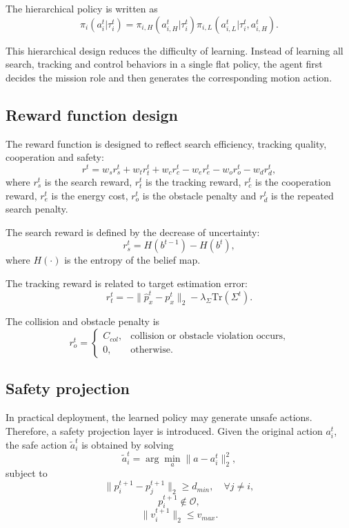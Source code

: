 \documentclass[14pt,a4paper]{extarticle}
\begin{document}
The hierarchical policy is written as
\[
\pi_i(a_i^t|\tau_i^t)=\pi_{i,H}(a_{i,H}^t|\tau_i^t)\pi_{i,L}(a_{i,L}^t|\tau_i^t,a_{i,H}^t).
\]

This hierarchical design reduces the difficulty of learning. Instead of learning all search, tracking and control behaviors in a single flat policy, the agent first decides the mission role and then generates the corresponding motion action.

\subsection{Reward function design}

The reward function is designed to reflect search efficiency, tracking quality, cooperation and safety:
\begin{equation}
  r^t=w_s r_s^t+w_t r_t^t+w_c r_c^t-w_e r_e^t-w_o r_o^t-w_d r_d^t,
\end{equation}
where $r_s^t$ is the search reward, $r_t^t$ is the tracking reward, $r_c^t$ is the cooperation reward, $r_e^t$ is the energy cost, $r_o^t$ is the obstacle penalty and $r_d^t$ is the repeated search penalty.

The search reward is defined by the decrease of uncertainty:
\begin{equation}
  r_s^t=H(b^{t-1})-H(b^t),
\end{equation}
where $H(\cdot)$ is the entropy of the belief map.

The tracking reward is related to target estimation error:
\begin{equation}
  r_t^t=-\|\hat{p}_x^t-p_x^t\|_2-\lambda_{\Sigma}\text{Tr}(\Sigma^t).
\end{equation}

The collision and obstacle penalty is
\begin{equation}
  r_o^t=
  \begin{cases}
  C_{col}, & \text{collision or obstacle violation occurs},\\
  0, & \text{otherwise}.
  \end{cases}
\end{equation}

\subsection{Safety projection}

In practical deployment, the learned policy may generate unsafe actions. Therefore, a safety projection layer is introduced. Given the original action $a_i^t$, the safe action $\tilde{a}_i^t$ is obtained by solving
\begin{equation}
  \tilde{a}_i^t=
  \arg\min_a \|a-a_i^t\|_2^2,
\end{equation}
subject to
\begin{equation}
  \|p_i^{t+1}-p_j^{t+1}\|_2 \geq d_{min}, \quad \forall j\neq i,
\end{equation}
\begin{equation}
  p_i^{t+1}\notin \mathcal{O},
\end{equation}
\begin{equation}
  \|v_i^{t+1}\|_2 \leq v_{max}.
\end{equation}
\end{document}
